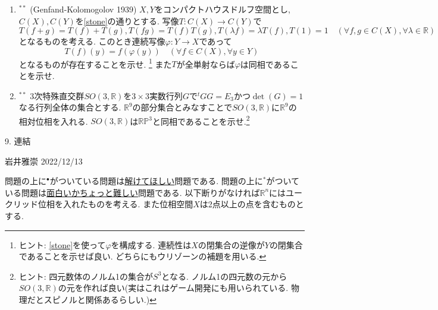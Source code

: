 \documentclass[dvipdfmx,a4paper,11pt]{article}
\newcommand{\R}{\mathbb{R}}
\theoremstyle{definition}
\begin{document}
\begin{enumerate}[label=\textbf{問}8.\arabic*]
\item $^{**}$\label{Gelfand} (Genfand-Kolomogolov 1939) $X,Y$をコンパクトハウスドルフ空間とし, $C(X), C(Y)$を\ref{stone}の通りとする.
写像$T : C(X) \rightarrow C(Y)$で
$$
T(f + g) = T(f) + T(g), T(fg)=T(f)T(g), T(\lambda f) = \lambda T(f), T(1) =1 \quad (\forall f,g \in C(X), \forall \lambda \in \R)
$$
となるものを考える.%
このとき連続写像$\varphi : Y \rightarrow X$であって
$$
T(f)(y) = f(\varphi(y)) \quad  (\forall f\in C(X), \forall y \in Y)
$$
となるものが存在することを示せ. \footnote{ヒント: \ref{stone}を使って$\varphi$を構成する. 連続性は$X$の閉集合の逆像が$Y$の閉集合であることを示せば良い. どちらにもウリゾーンの補題を用いる. }
また$T$が全単射ならば$\varphi$は同相であることを示せ.

 
\item \label{so3} $^{**}$ 3次特殊直交群$SO(3,\R)$を$ 3\times 3$実数行列$G$で$^{t}GG=E_3$かつ$\det(G)=1$なる行列全体の集合とする. $\R^{9}$の部分集合とみなすことで$SO(3,\R)$に$\R^{9}$の相対位相を入れる. 
$SO(3,\R)$は$\R\mathbb{P}^{3}$と同相であることを示せ.\footnote{ヒント: 四元数体のノルム1の集合が$S^3$となる. ノルム1の四元数の元から$SO(3,\R)$の元を作れば良い(実はこれはゲーム開発にも用いられている. 物理だとスピノルと関係あるらしい.)}

 \end{enumerate}



\newpage


\begin{center}
{\Large 9. 連結}
\end{center}

\begin{flushright}
 岩井雅崇 2022/12/13
\end{flushright}

問題の上に$^{\bullet}$がついている問題は\underline{解けてほしい}問題である. 問題の上に$^{*}$がついている問題は\underline{面白いかちょっと難しい}問題である.  以下断りがなければ$\R^{n}$にはユークリッド位相を入れたものを考える. また位相空間$X$は2点以上の点を含むものとする.
\end{document}
